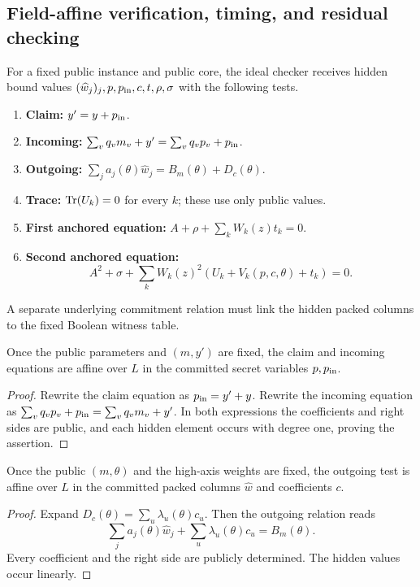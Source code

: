 \subsection{Field-affine verification, timing, and residual checking}\label{sec:zkrs:affine}

\begin{definition}\label{def:zkrs:affine-checks}
For a fixed public instance and public core, the ideal checker
receives hidden bound values
$(\widehat w_j)_j,p,p_{\rm in},c,t,\rho,\sigma$
with the following tests.
\begin{enumerate}[label=\textup{(\roman*)}]
\item \textbf{Claim:}
$y'=y+p_{\rm in}$.
\item \textbf{Incoming:}
$\sum_vq_vm_v+y'=\sum_vq_vp_v+p_{\rm in}$.
\item \textbf{Outgoing:}
$\sum_ja_j(\theta)\widehat w_j
=B_m(\theta)+D_c(\theta)$.
\item \textbf{Trace:} $\operatorname{Tr}(U_k)=0$ for every $k$;
these use only public values.
\item \textbf{First anchored equation:}
$A+\rho+\sum_kW_k(z)t_k=0$.
\item \textbf{Second anchored equation:}
\[
 A^2+\sigma+\sum_kW_k(z)^2
       (U_k+V_k(p,c,\theta)+t_k)=0.
\]
\end{enumerate}
A separate underlying commitment relation must link the
hidden packed columns to the fixed Boolean witness table.
\end{definition}

\begin{lemma}\label{lem:zkrs:claim-in-affine}
Once the public parameters and $(m,y')$ are fixed,
the claim and incoming equations are affine over $L$
in the committed secret variables
$p,p_{\rm in}$.
\end{lemma}
\begin{proof}
Rewrite the claim equation as
$p_{\rm in}=y'+y$.
Rewrite the incoming equation as
$\sum_vq_vp_v+p_{\rm in}=\sum_vq_vm_v+y'$.
In both expressions the coefficients and right sides
are public, and each hidden element occurs with
degree one, proving the assertion.
\end{proof}

\begin{lemma}\label{lem:zkrs:out-affine}
Once the public $(m,\theta)$ and the high-axis
weights are fixed, the outgoing test is affine
over $L$ in the committed packed columns
$\widehat w$ and coefficients $c$.
\end{lemma}
\begin{proof}
Expand $D_c(\theta)=\sum_u\lambda_u(\theta)c_u$.
Then the outgoing relation reads
\[
 \sum_ja_j(\theta)\widehat w_j+
 \sum_u\lambda_u(\theta)c_u=B_m(\theta).
\]
Every coefficient and the right side are publicly
determined. The hidden values occur linearly.
\end{proof}

